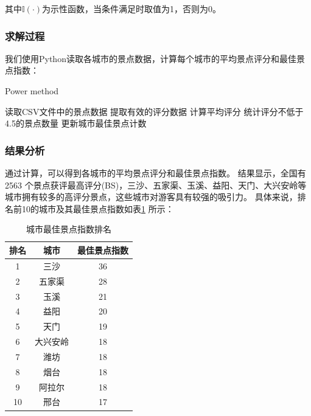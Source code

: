 \documentclass[withoutpreface,bwprint]{cumcmthesis} %
\begin{document}
其中$\mathbb{I}(\cdot)$为示性函数，当条件满足时取值为1，否则为0。

\subsubsection{求解过程}
我们使用Python读取各城市的景点数据，计算每个城市的平均景点评分和最佳景点指数：

\begin{algorithm}[H]
    \renewcommand{\algorithmicrequire}{\textbf{Input:}}
	\renewcommand{\algorithmicensure}{\textbf{Output:}}
	\caption{Power method}
    \label{power}
    \begin{algorithmic}[1] %
        \STATE 读取CSV文件中的景点数据
        \STATE 提取有效的评分数据
        \STATE 计算平均评分
        \STATE 统计评分不低于4.5的景点数量
        \STATE 更新城市最佳景点计数
    \ENDFOR
\end{algorithmic}
\end{algorithm}

\subsubsection{结果分析}
通过计算，可以得到各城市的平均景点评分和最佳景点指数。
结果显示，全国有 2563 个景点获评最高评分(BS)，三沙、五家渠、玉溪、益阳、天门、大兴安岭等城市拥有较多的高评分景点，这些城市对游客具有较强的吸引力。
具体来说，排名前10的城市及其最佳景点指数如表\ref{tab:best_scores} 所示：

\begin{table}[H]
\centering
\caption{城市最佳景点指数排名}
\label{tab:best_scores}
\begin{tabular}{ccc}
\hline
排名 & 城市 & 最佳景点指数 \\
\hline
1 & 三沙 & 36 \\
2 & 五家渠 & 28 \\
3 & 玉溪 & 21 \\
4 & 益阳 & 20 \\
5 & 天门 & 19 \\
6 & 大兴安岭 & 18 \\
7 & 潍坊 & 18 \\
8 & 烟台 & 18 \\
9 & 阿拉尔 & 18 \\
10 & 邢台 & 17 \\
\hline
\end{tabular}
\end{table}
\end{document}
